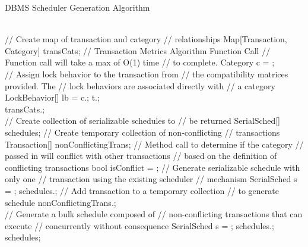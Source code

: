 \begin{algorithm}
\caption{DBMS Scheduler Generation Algorithm}
\label{alg:generate_sched}
\begin{algorithmic}[1]

  \\
  \State // Create map of transaction and category
  \State // relationships
  \State Map[Transaction, Category] transCats;
      \State // Transaction Metrics Algorithm Function Call
      \State // Function call will take a max of O(1) time
      \State // to complete.
      \State Category c = ; \label{l:getcatfortrans}
      \\
      \State // Assign lock behavior to the transaction from
      \State // the compatibility matrices provided. The 
      \State // lock behaviors are associated directly with
      \State // a category
      \State LockBehavior[] lb = c.; 
      \State t.; \label{l:setlockbehaviors}
      \\
      \State transCats.; \label{l:tcadd}
  \EndFor
  \\
  \State // Create collection of serializable schedules to
  \State // be returned
  \State SerialSched[] schedules;
  \State // Create temporary collection of non-conflicting
  \State // transactions
  \State Transaction[] nonConflictingTrans;
      \State // Method call to determine if the category 
      \State // passed in will conflict with other transactions
      \State // based on the definition of conflicting transactions
      \State bool isConflict = ;
        \State // Generate serializable schedule with only one
        \State // transaction using the existing scheduler 
        \State // mechanism
        \State SerialSched s = ;\label{l:gencsched}
        \State schedules.;
      \Else
        \State // Add transaction to a temporary collection
        \State // to generate schedule
        \State nonConflictingTrans.; \label{l:tempds}
      \EndIf
  \EndFor
  \\
  \State // Generate a bulk schedule composed of 
  \State // non-conflicting transactions that can execute
  \State // concurrently without consequence
  \State SerialSched s = ;\label{l:bulksched}
  \State schedules.;
  \\
  \State \Return schedules; \label{l:rtnsched}
 \EndFunction
 
\end{algorithmic}
\end{algorithm}